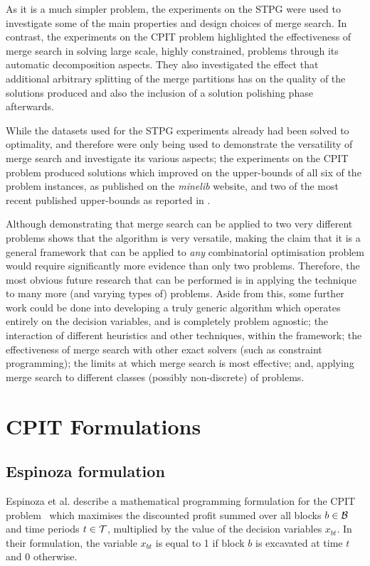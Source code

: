 \documentclass[preprint]{elsarticle}
\begin{document}
As it is a much simpler problem, the experiments on the STPG were used to investigate some of the main properties and design choices of merge search. In contrast, the experiments on the CPIT problem highlighted the effectiveness of merge search in solving large scale, highly constrained, problems through its automatic decomposition aspects. They also investigated the effect that additional arbitrary splitting of the merge partitions has on the quality of the solutions produced and also the inclusion of a solution polishing phase afterwards.

While the datasets used for the STPG experiments already had been solved to optimality, and therefore were only being used to demonstrate the versatility of merge search and investigate its various aspects; the experiments on the CPIT problem produced solutions which improved on the upper-bounds of all six of the problem instances, as published on the \emph{minelib} website, and two of the most recent published upper-bounds as reported in \citet{minelib-improved}.

\smallskip

Although demonstrating that merge search can be applied to two very different problems shows that the algorithm is very versatile, making the claim that it is a general framework that can be applied to \emph{any} combinatorial optimisation problem would require significantly more evidence than only two problems. Therefore, the most obvious future research that can be performed is in applying the technique to many more (and varying types of) problems. Aside from this, some further work could be done into developing a truly generic algorithm which operates entirely on the decision variables, and is completely problem agnostic; the interaction of different heuristics and other techniques, within the framework; the effectiveness of merge search with other exact solvers (such as constraint programming); the limits at which merge search is most effective; and, applying merge search to different classes (possibly non-discrete) of problems.



\appendix
\section{CPIT Formulations}\label{app:cpit}
\subsection*{Espinoza formulation}
Espinoza et al. describe a mathematical programming formulation for the CPIT problem~\citet{minelib} which maximises the discounted profit summed over all blocks $b \in \S{B}$ and time periods $t \in \S{T}$, multiplied by the value of the decision variables $x_{bt}$. In their formulation, the variable $x_{bt}$ is equal to 1 if block $b$ is excavated at time $t$ and 0 otherwise.\par 
\end{document}

